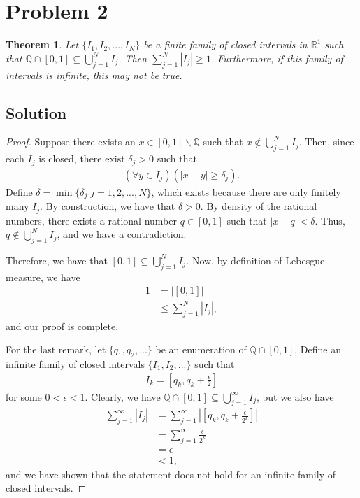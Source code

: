 \documentclass[10pt,a4paper]{article}
\theoremstyle{theorem}
\newtheorem{theorem}{Theorem}
\theoremstyle{definition}
\begin{document}
\section*{Problem 2}
\begin{theorem}
Let $\{I_1, I_2, ...,I_N \}$ be a finite family of closed intervals in $\mathbb{R}^1$ such that $\mathbb{Q} \cap [0, 1] \subseteq \bigcup_{j = 1}^N I_j$. Then $\sum_{j = 1}^N |I_j| \geq 1$. Furthermore, if this family of intervals is infinite, this may not be true.
\end{theorem}

\subsection*{Solution}

\begin{proof}
Suppose there exists an $x \in [0, 1] \backslash \mathbb{Q}$ such that $x \not\in \bigcup_{j = 1}^N I_j$. Then, since each $I_j$ is closed, there exist $\delta_j > 0$ such that 
\begin{align*}
(\forall y \in I_j)(|x - y| \geq \delta_j).
\end{align*}
Define $\delta = \min \{\delta_j | j = 1,2,...,N\}$, which exists because there are only finitely many $I_j$. By construction, we have that $\delta > 0$. By density of the rational numbers, there exists a rational number $q \in [0, 1]$ such that $|x - q| < \delta$. Thus,  $q \not \in \bigcup_{j = 1}^N I_j$, and we have a contradiction. 

Therefore, we have that $[0, 1] \subseteq \bigcup_{j = 1}^N I_j$. Now, by definition of Lebesgue measure, we have
\begin{align*}
1 &= |[0, 1]|\\
&\leq \sum_{j = 1}^N |I_j| ,
\end{align*}
and our proof is complete.

For the last remark, let $\{q_1, q_2,...\}$ be an enumeration of $\mathbb{Q} \cap [0, 1] $. Define an infinite family of closed intervals $\{I_1, I_2,...\}$ such that 
\begin{align*}
I_k = [q_k, q_k + \frac{\epsilon}{2}]
\end{align*}
for some $0 < \epsilon <1$.  Clearly, we have $\mathbb{Q} \cap [0, 1] \subseteq \bigcup_{j = 1}^\infty I_j$, but we also have
\begin{align*}
\sum_{j = 1}^\infty |I_j| &= \sum_{j = 1}^\infty |[q_k, q_k + \frac{\epsilon}{2^k}]|\\
&= \sum_{j = 1}^\infty \frac{\epsilon}{2^k}\\
&= \epsilon\\
&<1,
\end{align*}
and we have shown that the statement does not hold for an infinite family of closed intervals.
\end{proof}
\end{document}
